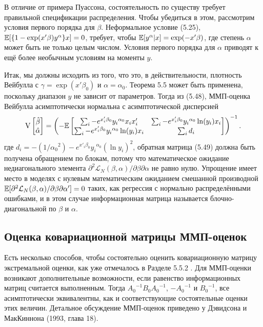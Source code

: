 В отличие от примера Пуассона, состоятельность по существу требует правильной спецификации распределения. Чтобы убедиться в этом, рассмотрим условия первого порядка для $\beta$. Неформальное условие (5.25), $\mathbb{E}[\{1-\exp(x'\beta){y}^{\alpha}\}x]=0$, требует, чтобы $\mathbb{E}[y^{\alpha}|x]=\exp(-x'\beta)$, где степень $\alpha$ может быть не только целым числом. Условия первого порядка для $\alpha$ приводят к ещё более необычным условиям на моменты $y$.

Итак, мы должны исходить из того, что это, в действительности, плотность Вейбулла с $\gamma=\exp(x'\beta_0)$ и $\alpha=\alpha_0$. Теорема 5.5 может быть применена, поскольку диапазон $y$ не зависит от параметров. Тогда из (5.48), ММП-оценка Вейбулла асимптотически нормальна с асимптотической дисперсией
\begin{equation}
\mathrm{V} \begin{bmatrix} \hat{\beta} \\ \hat{\alpha} \end{bmatrix}  = \begin{pmatrix} -\mathbb{E} \begin{bmatrix} \sum_i -e^{x'_i\beta_0} {y_i}^{\alpha_0} x_i x'_i & \sum_i -e^{x'_i\beta_0}{y_i}^{\alpha_0}\ln(y_i)x_i \\ \sum_i -e^{x'_i\beta_0}{y_i}^{\alpha_0}\ln(y_i)x_i & \sum_i d_i \end{bmatrix} \end{pmatrix} ^{-1}.
\end{equation}
где $d_i=-(1/{\alpha_0}^{2})-e^{x'_i\beta_0}{y_i}^{\alpha_0} (\ln y_i)^2$, обратная матрица (5.49) должна быть получена обращением по блокам, потому что математическое ожидание недиагонального элемента $\partial^2 \mathcal{L}_{N}(\beta,\alpha)/ \partial \beta \partial \alpha$ не равно нулю. Упрощение имеет место в моделях с нулевым математическим ожиданием смешанной производной $\mathbb{E}[\partial^2 \mathcal{L}_{N}(\beta,\alpha)/ \partial \beta \partial \alpha']=0$ таких, как регрессия с нормально распределёнными ошибками, и в этом случае информационная матрица называется блочно-диагональной по $\beta$ и $\alpha$.

\subsection{Оценка ковариационной матрицы ММП-оценок} 

Есть несколько способов, чтобы состоятельно оценить ковариационную матрицу
экстремальной оценки, как уже отмечалось в Разделе 5.5.2 . Для ММП-оценки возникают дополнительные возможности, если равенство информационных матриц считается выполненным. Тогда ${A_0}^{-1}B_0{A_0}^{-1}$, ${-A_0}^{-1}$ и ${B_0}^{-1}$, все асимптотически эквивалентны, как и соответствующие состоятельные оценки этих величин. Детальное обсуждение ММП-оценок приведено у Дэвидсона и МакКиннона (1993, глава 18).

